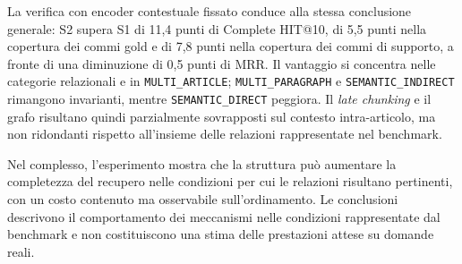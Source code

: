 La verifica con encoder contestuale fissato conduce alla stessa conclusione generale: S2 supera S1 di 11,4 punti di Complete HIT@10, di 5,5 punti nella copertura dei commi gold e di 7,8 punti nella copertura dei commi di supporto, a fronte di una diminuzione di 0,5 punti di MRR. Il vantaggio si concentra nelle categorie relazionali e in \texttt{MULTI\_ARTICLE}; \texttt{MULTI\_PARAGRAPH} e \texttt{SEMANTIC\_INDIRECT} rimangono invarianti, mentre \texttt{SEMANTIC\_DIRECT} peggiora. Il \textit{late chunking} e il grafo risultano quindi parzialmente sovrapposti sul contesto intra-articolo, ma non ridondanti rispetto all'insieme delle relazioni rappresentate nel benchmark.

Nel complesso, l'esperimento mostra che la struttura può aumentare la completezza del recupero nelle condizioni per cui le relazioni risultano pertinenti, con un costo contenuto ma osservabile sull'ordinamento. Le conclusioni descrivono il comportamento dei meccanismi nelle condizioni rappresentate dal benchmark e non costituiscono una stima delle prestazioni attese su domande reali.
